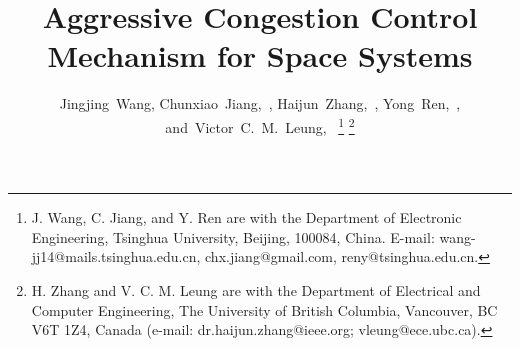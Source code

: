 \documentclass[draftclsnofoot,onecolumn,11pt]{IEEEtran}
\begin{document}
%
\title{Aggressive Congestion Control Mechanism for Space Systems}
%
%


\author{Jingjing~Wang, Chunxiao~Jiang,~, Haijun~Zhang,~, Yong~Ren,~, and~Victor~C.~M.~Leung,~%
\thanks{J. Wang, C. Jiang, and Y. Ren are with the Department
of Electronic Engineering, Tsinghua University, Beijing, 100084, China. E-mail: wang-jj14@mails.tsinghua.edu.cn, chx.jiang@gmail.com, reny@tsinghua.edu.cn.}
\thanks{H. Zhang and V. C. M. Leung are with the Department of Electrical and Computer Engineering,
The University of British Columbia, Vancouver, BC V6T 1Z4, Canada
(e-mail: dr.haijun.zhang@ieee.org; vleung@ece.ubc.ca).}
}


%
%



%
\end{document}
